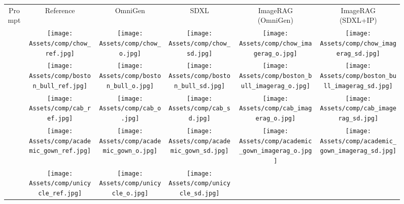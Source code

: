 \begin{figure*}[htpb]
    \centering
    \setlength{\tabcolsep}{0.7pt}

    \begin{tabular}{c c | c c c c}
        Prompt & Reference & OmniGen & SDXL & \makecell{ImageRAG \\ (OmniGen)} & \makecell{ImageRAG \\ (SDXL+IP)} \\
        \raisebox{0.5in}{Chow} &
        \texttt{[image: Assets/comp/chow\_ref.jpg]} &
        \texttt{[image: Assets/comp/chow\_o.jpg]} &
        \texttt{[image: Assets/comp/chow\_sd.jpg]} &
        \texttt{[image: Assets/comp/chow\_imagerag\_o.jpg]} &
        \texttt{[image: Assets/comp/chow\_imagerag\_sd.jpg]} \\
        \raisebox{0.5in}{Boston bull} &
        \texttt{[image: Assets/comp/boston\_bull\_ref.jpg]} &
        \texttt{[image: Assets/comp/boston\_bull\_o.jpg]} &
        \texttt{[image: Assets/comp/boston\_bull\_sd.jpg]} &
        \texttt{[image: Assets/comp/boston\_bull\_imagerag\_o.jpg]} &
        \texttt{[image: Assets/comp/boston\_bull\_imagerag\_sd.jpg]} \\
        \raisebox{0.5in}{Cab} &
        \texttt{[image: Assets/comp/cab\_ref.jpg]} &
        \texttt{[image: Assets/comp/cab\_o.jpg]} &
        \texttt{[image: Assets/comp/cab\_sd.jpg]} &
        \texttt{[image: Assets/comp/cab\_imagerag\_o.jpg]} &
        \texttt{[image: Assets/comp/cab\_imagerag\_sd.jpg]} \\
        \raisebox{0.5in}{Academic gown} &
        \texttt{[image: Assets/comp/academic\_gown\_ref.jpg]} &
        \texttt{[image: Assets/comp/academic\_gown\_o.jpg]} &
        \texttt{[image: Assets/comp/academic\_gown\_sd.jpg]} &
        \texttt{[image: Assets/comp/academic\_gown\_imagerag\_o.jpg]} &
        \texttt{[image: Assets/comp/academic\_gown\_imagerag\_sd.jpg]} \\
        \raisebox{0.5in}{Unicycle} &
        \texttt{[image: Assets/comp/unicycle\_ref.jpg]} &
        \texttt{[image: Assets/comp/unicycle\_o.jpg]} &
        \texttt{[image: Assets/comp/unicycle\_sd.jpg]} &

\end{tabular}
\end{figure*}
